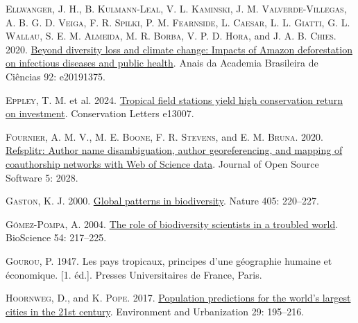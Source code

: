 \documentclass[
  12pt,
  man, donotrepeattitle,floatsintext]{apa6}
\newlength{\cslhangindent}
\newlength{\cslentryspacingunit} %
\newenvironment{CSLReferences}[2] %
 {%
  \setlength{\parindent}{0pt}
  \ifodd #1
  \let\oldpar\par
  \def\par{\hangindent=\cslhangindent\oldpar}
  \fi
  \setlength{\parskip}{#2\cslentryspacingunit}
 }%
 {}
\begin{document}
\begin{CSLReferences}{1}{0}
\leavevmode{}%
\textsc{Ellwanger, J. H.}, \textsc{B. Kulmann-Leal}, \textsc{V. L. Kaminski}, \textsc{J. M. Valverde-Villegas}, \textsc{A. B. G. D. Veiga}, \textsc{F. R. Spilki}, \textsc{P. M. Fearnside}, \textsc{L. Caesar}, \textsc{L. L. Giatti}, \textsc{G. L. Wallau}, \textsc{S. E. M. Almeida}, \textsc{M. R. Borba}, \textsc{V. P. D. Hora}, and \textsc{J. A. B. Chies}. 2020. \href{https://doi.org/10.1590/0001-3765202020191375}{Beyond diversity loss and climate change: {Impacts} of {Amazon} deforestation on infectious diseases and public health}. Anais da Academia Brasileira de Ci{ê}ncias 92: e20191375.

\leavevmode{}%
\textsc{Eppley, T. M.} et al. 2024. \href{https://doi.org/10.1111/conl.13007}{Tropical field stations yield high conservation return on investment}. Conservation Letters e13007.

\leavevmode{}%
\textsc{Fournier, A. M. V.}, \textsc{M. E. Boone}, \textsc{F. R. Stevens}, and \textsc{E. M. Bruna}. 2020. \href{https://doi.org/10.21105/joss.02028}{Refsplitr: {Author} name disambiguation, author georeferencing, and mapping of coauthorship networks with {Web} of {Science} data}. Journal of Open Source Software 5: 2028.

\leavevmode{}%
\textsc{Gaston, K. J.} 2000. \href{https://doi.org/10.1038/35012228}{Global patterns in biodiversity}. Nature 405: 220--227.

\leavevmode{}%
\textsc{Gómez-Pompa, A.} 2004. \href{https://doi.org/10.1641/0006-3568(2004)054\%5B0217:TROBSI\%5D2.0.CO;2}{The role of biodiversity scientists in a troubled world}. BioScience 54: 217--225.

\leavevmode{}%
\textsc{Gourou, P.} 1947. {Les pays tropicaux, principes d'une g{é}ographie humaine et {é}conomique.} {[}1. {é}d.{]}. Presses Universitaires de France, Paris.

\leavevmode{}%
\textsc{Hoornweg, D.}, and \textsc{K. Pope}. 2017. \href{https://doi.org/10.1177/0956247816663557}{Population predictions for the world's largest cities in the 21st century}. Environment and Urbanization 29: 195--216.


\end{CSLReferences}
\end{document}
